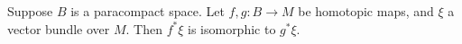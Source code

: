 Suppose $B$ is a paracompact space. Let $f, g: B \to M$ be homotopic maps, and $\xi$ a vector bundle over $M$. Then $f^*\xi$ is isomorphic to $g^*\xi$.
